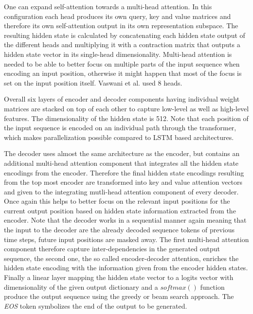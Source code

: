 One can expand self-attention towards a multi-head attention. In this configuration each head produces its own query, key and value matrices and therefore its own self-attention output in its own representation subspace. The resulting hidden state is calculated by concatenating each hidden state output of the different heads and multiplying it with a contraction matrix that outputs a hidden state vector in its single-head dimensionality. Multi-head attention is needed to be able to better focus on multiple parts of the input sequence when encoding an input position, otherwise it might happen that most of the focus is set on the input position itself. Vaswani et al. \cite{Vaswani2017} used 8 heads. \cite{Alammar2018, Vaswani2017}

Overall six layers of encoder and decoder components having individual weight matrices are stacked on top of each other to capture low-level as well as high-level features. The dimensionality of the hidden state is 512. Note that each position of the input sequence is encoded on an individual path through the transformer, which makes parallelization possible compared to \ac{LSTM} based architectures. \cite{Alammar2018, Vaswani2017}

The decoder uses almost the same architecture as the encoder, but contains an additional multi-head attention component that integrates all the hidden state encodings from the encoder. Therefore the final hidden state encodings resulting from the top most encoder are transformed into key and value attention vectors and given to the integrating mutli-head attention component of every decoder. Once again this helps to better focus on the relevant input positions for the current output position based on hidden state information extracted from the encoder. Note that the decoder works in a sequential manner again meaning that the input to the decoder are the already decoded sequence tokens of previous time steps, future input positions are masked away. The first multi-head attention component therefore capture inter-dependencies in the generated output sequence, the second one, the so called encoder-decoder attention, enriches the hidden state encoding with the in\-for\-ma\-ti\-on given from the encoder hidden states. Finally a linear layer mapping the hidden state vector to a logits vector with dimensionality of the given output dictionary and a $softmax()$ function produce the output sequence using the greedy or beam search approach. The \textit{EOS} token symbolizes the end of the output to be generated. \cite{Alammar2018, Vaswani2017}

